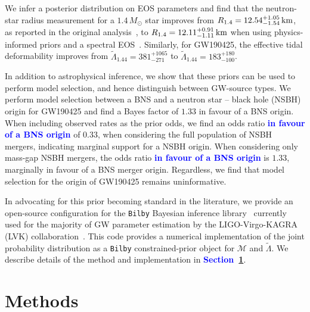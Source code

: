 \documentclass[twocolumn,linenumbers]{aastex631}
\newcommand{\blue}[1]{\textcolor{blue}{\textbf{#1}}}
\begin{document}
We infer a posterior distribution on EOS parameters and find that the
neutron-star radius measurement for a $1.4\,{M_\odot}$ star improves from
${R_{1.4}}=12.54^{+1.05}_{-1.54}\,{\rm km}$, as reported in the original
analysis~\citep{abbott19_170817Properties}, to
${R_{1.4}}=12.11^{+0.91}_{-1.11}\,{\rm km}$ when using physics-informed
priors and a spectral EOS~\citep[see also][for some of the first
  estimates made after the GW170817
  event]{Most2018,Capano2020}. Similarly, for GW190425, the effective
tidal deformability improves from $\tilde{\Lambda}_{1.44} =
381^{+1065}_{-271}$ to $\tilde{\Lambda}_{1.44} = 183^{+180}_{-100}$.

In addition to astrophysical inference, we show that these priors can be
used to perform model selection, and hence distinguish between GW-source
types. We perform model selection between a BNS and a neutron star --
black hole (NSBH) origin for GW190425 and find a Bayes factor of $1.33$
in favour of a BNS origin. When including observed rates as the prior
odds, we find an odds ratio \blue{in favour of a BNS origin} of $0.33$,
when considering the full population of NSBH mergers, indicating marginal
support for a NSBH origin.  When considering only mass-gap NSBH mergers,
the odds ratio \blue{in favour of a BNS origin} is $1.33$, marginally in
favour of a BNS merger origin. Regardless, we find that model selection
for the origin of GW190425 remains uninformative.
	
In advocating for this prior becoming standard in the literature, we
provide an open-source configuration for the \texttt{Bilby} Bayesian
inference library~\citep{ashton19,romeroshaw20} currently used for the
majority of GW parameter estimation by the LIGO-Virgo-KAGRA (LVK)
collaboration~\citep[e.g.,][]{LIGO, Virgo, KAGRA}. This code provides a
numerical implementation of the joint probability distribution as a
\texttt{Bilby} constrained-prior object for $\mathcal{M}$ and
$\tilde{\Lambda}$. We describe details of the method and implementation
in \blue{Section~\ref{sec:Methods}}.


\section{Methods}
\label{sec:Methods}
	
\end{document}
